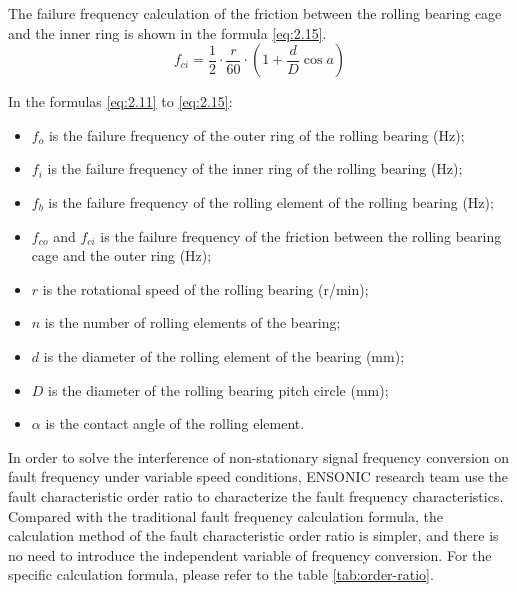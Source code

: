 \documentclass{article}
\begin{document}
The failure frequency calculation of the friction between the rolling bearing cage and the inner ring is shown in the formula \ref{eq:2.15}.
\begin{equation}
    f_{ci} = \frac{1}{2} \cdot \frac{r}{60} \cdot \left( 1 + \frac{d}{D} \cos a \right)
    \label{eq:2.15}
\end{equation}

In the formulas \ref{eq:2.11} to \ref{eq:2.15}:
\begin{itemize}
    \item $f_o$ is the failure frequency of the outer ring of the rolling bearing (Hz);
    \item $f_i$ is the failure frequency of the inner ring of the rolling bearing (Hz);
    \item $f_b$ is the failure frequency of the rolling element of the rolling bearing (Hz);
    \item $f_{co}$ and $f_{ci}$ is the failure frequency of the friction between the rolling bearing cage and the outer ring (Hz);
    \item $r$ is the rotational speed of the rolling bearing (r/min);
    \item $n$ is the number of rolling elements of the bearing;
    \item $d$ is the diameter of the rolling element of the bearing (mm);
    \item $D$ is the diameter of the rolling bearing pitch circle (mm);
    \item $\alpha$ is the contact angle of the rolling element.
\end{itemize}

In order to solve the interference of non-stationary signal frequency conversion on fault frequency under variable speed conditions, ENSONIC research team use the fault characteristic order ratio to characterize the fault frequency characteristics. Compared with the traditional fault frequency calculation formula, the calculation method of the fault characteristic order ratio is simpler, and there is no need to introduce the independent variable of frequency conversion. For the specific calculation formula, please refer to the table \ref{tab:order-ratio}.
\end{document}
